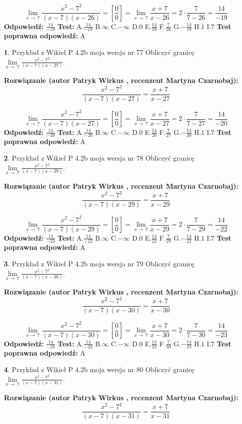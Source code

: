 \documentclass[12pt, a4paper]{article}
\theoremstyle{definition} %
\newtheorem{zad}{}
\newcommand{\zadStart}[1]{\begin{zad}#1\newline}
\newcommand{\zadStop}{\end{zad}}
\newcommand{\rozwStart}[2]{\noindent \textbf{Rozwiązanie (autor #1 , recenzent #2): }\newline}
\newcommand{\rozwStop}{\newline}
\newcommand{\odpStart}{\noindent \textbf{Odpowiedź:}\newline}
\newcommand{\odpStop}{\newline}
\newcommand{\testStart}{\noindent \textbf{Test:}\newline}
\newcommand{\testStop}{\newline}
\newcommand{\kluczStart}{\noindent \textbf{Test poprawna odpowiedź:}\newline}
\newcommand{\kluczStop}{\newline}
\begin{document}
$$\lim\limits_{x\to\ 7}\frac{x^{2}-7^{2}}{(x-7)(x-26)}=[\frac{0}{0}]=\lim\limits_{x\to\ 7}\frac{x+7}{x-26}=2 \cdot \frac{7}{7-26} = \frac{14}{-19}$$
\rozwStop
\odpStart
$\frac{14}{-19}$
\odpStop
\testStart
A.$\frac{14}{-19}$
B.$\infty$
C.$-\infty$
D.$0$
E.$\frac{14}{19}$
F.$\frac{7}{26}$
G.$-\frac{14}{19}$
H.$1$
I.$7$
\testStop
\kluczStart
A
\kluczStop



\zadStart{Przykład z Wikieł P 4.2b moja wersja nr 77}
Obliczyć granicę $\lim\limits_{x\to\ 7}\frac{x^{2}-7^{2}}{(x-7)(x-27)}$.
\zadStop
\rozwStart{Patryk Wirkus}{Martyna Czarnobaj}
$$\frac{x^{2}-7^{2}}{(x-7)(x-27)}=\frac{x+7}{x-27}$$

$$\lim\limits_{x\to\ 7}\frac{x^{2}-7^{2}}{(x-7)(x-27)}=[\frac{0}{0}]=\lim\limits_{x\to\ 7}\frac{x+7}{x-27}=2 \cdot \frac{7}{7-27} = \frac{14}{-20}$$
\rozwStop
\odpStart
$\frac{14}{-20}$
\odpStop
\testStart
A.$\frac{14}{-20}$
B.$\infty$
C.$-\infty$
D.$0$
E.$\frac{14}{20}$
F.$\frac{7}{27}$
G.$-\frac{14}{20}$
H.$1$
I.$7$
\testStop
\kluczStart
A
\kluczStop



\zadStart{Przykład z Wikieł P 4.2b moja wersja nr 78}
Obliczyć granicę $\lim\limits_{x\to\ 7}\frac{x^{2}-7^{2}}{(x-7)(x-29)}$.
\zadStop
\rozwStart{Patryk Wirkus}{Martyna Czarnobaj}
$$\frac{x^{2}-7^{2}}{(x-7)(x-29)}=\frac{x+7}{x-29}$$

$$\lim\limits_{x\to\ 7}\frac{x^{2}-7^{2}}{(x-7)(x-29)}=[\frac{0}{0}]=\lim\limits_{x\to\ 7}\frac{x+7}{x-29}=2 \cdot \frac{7}{7-29} = \frac{14}{-22}$$
\rozwStop
\odpStart
$\frac{14}{-22}$
\odpStop
\testStart
A.$\frac{14}{-22}$
B.$\infty$
C.$-\infty$
D.$0$
E.$\frac{14}{22}$
F.$\frac{7}{29}$
G.$-\frac{14}{22}$
H.$1$
I.$7$
\testStop
\kluczStart
A
\kluczStop



\zadStart{Przykład z Wikieł P 4.2b moja wersja nr 79}
Obliczyć granicę $\lim\limits_{x\to\ 7}\frac{x^{2}-7^{2}}{(x-7)(x-30)}$.
\zadStop
\rozwStart{Patryk Wirkus}{Martyna Czarnobaj}
$$\frac{x^{2}-7^{2}}{(x-7)(x-30)}=\frac{x+7}{x-30}$$

$$\lim\limits_{x\to\ 7}\frac{x^{2}-7^{2}}{(x-7)(x-30)}=[\frac{0}{0}]=\lim\limits_{x\to\ 7}\frac{x+7}{x-30}=2 \cdot \frac{7}{7-30} = \frac{14}{-23}$$
\rozwStop
\odpStart
$\frac{14}{-23}$
\odpStop
\testStart
A.$\frac{14}{-23}$
B.$\infty$
C.$-\infty$
D.$0$
E.$\frac{14}{23}$
F.$\frac{7}{30}$
G.$-\frac{14}{23}$
H.$1$
I.$7$
\testStop
\kluczStart
A
\kluczStop



\zadStart{Przykład z Wikieł P 4.2b moja wersja nr 80}
Obliczyć granicę $\lim\limits_{x\to\ 7}\frac{x^{2}-7^{2}}{(x-7)(x-31)}$.
\zadStop
\rozwStart{Patryk Wirkus}{Martyna Czarnobaj}
$$\frac{x^{2}-7^{2}}{(x-7)(x-31)}=\frac{x+7}{x-31}$$
\end{document}
